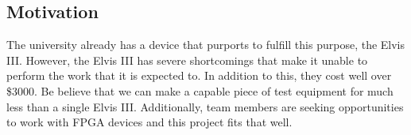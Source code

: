\subsection{Motivation}
The university already has a device that purports to fulfill this purpose, the Elvis III. However, the Elvis III has severe shortcomings that make it unable to perform the work that it is expected to. In addition to this, they cost well over \$3000. Be believe that we can make a capable piece of test equipment for much less than a single Elvis III. Additionally, team members are seeking opportunities to work with FPGA devices and this project fits that well.

